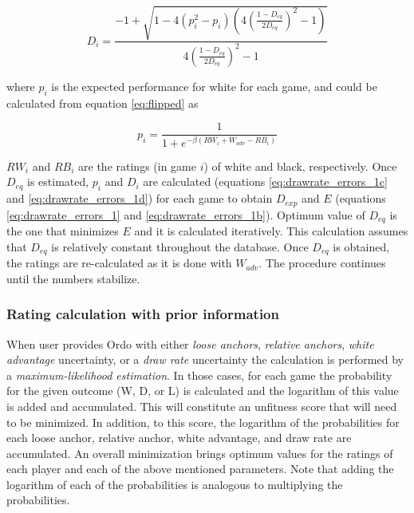 \documentclass[12pt]{article}
\begin{document}
	\begin{equation} \label{eq:drawrate_errors_1c}
	D_{i} = \frac{- 1 + \sqrt{ 1 - 4 (p_{i}^2-p_{i}) (4 (\frac{1-D_{eq}}{2 D_{eq}})^2 - 1) }  }{4 (\frac{1-D_{eq}}{2 D_{eq}})^2 - 1} 
	\end{equation}

where $p_{i}$ is the expected performance for white for each game, and could be calculated from equation \ref{eq:flipped} as

	\begin{equation} \label{eq:drawrate_errors_1d}
	p_{i} = \frac{1}{1 + e^{-\beta(RW_{i} + W_{adv}-RB_{i})}}
	\end{equation}

$RW_{i}$ and $RB_{i}$ are the ratings (in game $i$) of white and black, respectively.
Once $D_{eq}$ is estimated, $p_{i}$ and $D_{i}$ are calculated (equations \ref{eq:drawrate_errors_1c} and \ref{eq:drawrate_errors_1d}) for each game to obtain $D_{exp}$ and $E$ (equations \ref{eq:drawrate_errors_1} and \ref{eq:drawrate_errors_1b}).
Optimum value of $D_{eq}$ is the one that minimizes $E$ and it is calculated iteratively.
This calculation assumes that $D_{eq}$ is relatively constant throughout the database.
Once $D_{eq}$ is obtained, the ratings are re-calculated as it is done with $W_{adv}$.
The procedure continues until the numbers stabilize.

\subsubsection*{Rating calculation with prior information}

When user provides Ordo with either \textit{loose anchors}, \textit{relative anchors}, \textit{white advantage} uncertainty, or a \textit{draw rate} uncertainty the calculation is performed by a \textit{maximum-likelihood estimation}.
In those cases, for each game the probability for the given outcome (W, D, or L) is calculated and the logarithm of this value is added and accumulated.
This will constitute an unfitness score that will need to be minimized.
In addition, to this score, the logarithm of the probabilities for each loose anchor, relative anchor, white advantage, and draw rate are accumulated.
An overall minimization brings optimum values for the ratings of each player and each of the above mentioned parameters. 
Note that adding the logarithm of each of the probabilities is analogous to multiplying the probabilities.
\end{document}
